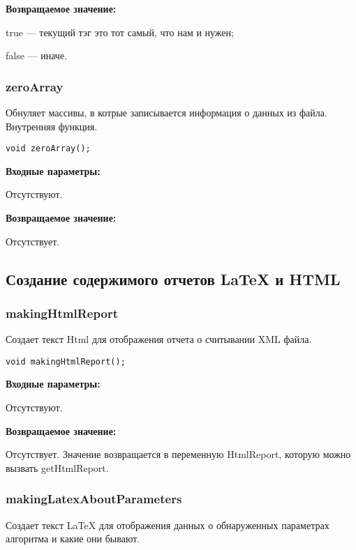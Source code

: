 \textbf{Возвращаемое значение:}

 
    true --- текущий тэг это тот самый, что нам и нужен;
 
    false --- иначе.


\subsubsection{zeroArray}\label{zeroArray}

Обнуляет массивы, в котрые записывается информация о данных из файла. Внутренняя функция.


\begin{lstlisting}[label=code_syntax_zeroArray,caption=Синтаксис]
void zeroArray();
\end{lstlisting}

\textbf{Входные параметры:}

Отсутствуют.

\textbf{Возвращаемое значение:}

Отсутствует.


\subsection{Создание содержимого отчетов LaTeX и HTML}

\subsubsection{makingHtmlReport}\label{makingHtmlReport}

Создает текст Html для отображения отчета о считывании XML файла.


\begin{lstlisting}[label=code_syntax_makingHtmlReport,caption=Синтаксис]
void makingHtmlReport();
\end{lstlisting}

\textbf{Входные параметры:}

Отсутствуют.

\textbf{Возвращаемое значение:}

Отсутствует. Значение возвращается в переменную HtmlReport, которую можно вызвать getHtmlReport.


\subsubsection{makingLatexAboutParameters}\label{makingLatexAboutParameters}

Создает текст LaTeX для отображения данных о обнаруженных параметрах алгоритма и какие они бывают.


